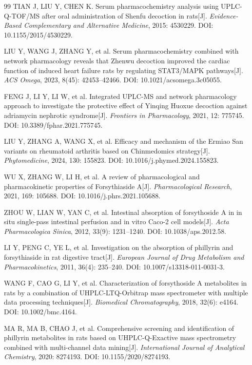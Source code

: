 \documentclass[12pt,a4paper,UTF8,openany]{ctexbook}
\begin{document}
\begin{thebibliography}{99}
TIAN J, LIU Y, CHEN K. Serum pharmacochemistry analysis using UPLC-Q-TOF/MS after oral administration of Shenfu decoction in rats[J]. \textit{Evidence-Based Complementary and Alternative Medicine}, 2015: 4530229. DOI: 10.1155/2015/4530229.

LIU Y, WANG J, ZHANG Y, et al. Serum pharmacochemistry combined with network pharmacology reveals that Zhenwu decoction improved the cardiac function of induced heart failure rats by regulating STAT3/MAPK pathways[J]. \textit{ACS Omega}, 2023, 8(45): 42453--42466. DOI: 10.1021/acsomega.3c05055.

FENG J, LI Y, LI W, et al. Integrated UPLC-MS and network pharmacology approach to investigate the protective effect of Yinqing Huoxue decoction against adriamycin nephrotic syndrome[J]. \textit{Frontiers in Pharmacology}, 2021, 12: 775745. DOI: 10.3389/fphar.2021.775745.

LIU Y, ZHANG A, WANG X, et al. Efficacy and mechanism of the Ermiao San variants on rheumatoid arthritis based on Chinmedomics strategy[J]. \textit{Phytomedicine}, 2024, 130: 155823. DOI: 10.1016/j.phymed.2024.155823.

WU X, ZHANG W, LI H, et al. A review of pharmacological and pharmacokinetic properties of Forsythiaside A[J]. \textit{Pharmacological Research}, 2021, 169: 105688. DOI: 10.1016/j.phrs.2021.105688.

ZHOU W, LIAN W, YAN C, et al. Intestinal absorption of forsythoside A in in situ single-pass intestinal perfusion and in vitro Caco-2 cell models[J]. \textit{Acta Pharmacologica Sinica}, 2012, 33(9): 1231--1240. DOI: 10.1038/aps.2012.58.

LI Y, PENG C, YE L, et al. Investigation on the absorption of phillyrin and forsythiaside in rat digestive tract[J]. \textit{European Journal of Drug Metabolism and Pharmacokinetics}, 2011, 36(4): 235--240. DOI: 10.1007/s13318-011-0031-3.

WANG F, CAO G, LI Y, et al. Characterization of forsythoside A metabolites in rats by a combination of UHPLC-LTQ-Orbitrap mass spectrometer with multiple data processing techniques[J]. \textit{Biomedical Chromatography}, 2018, 32(6): e4164. DOI: 10.1002/bmc.4164.

MA R, MA B, CHAO J, et al. Comprehensive screening and identification of phillyrin metabolites in rats based on UHPLC-Q-Exactive mass spectrometry combined with multi-channel data mining[J]. \textit{International Journal of Analytical Chemistry}, 2020: 8274193. DOI: 10.1155/2020/8274193.


\end{thebibliography}
\end{document}

